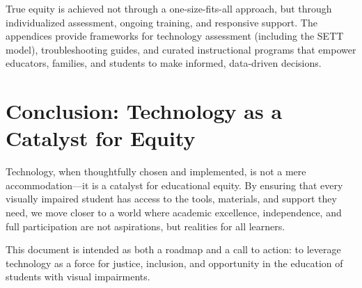 True equity is achieved not through a one-size-fits-all approach, but through individualized assessment, ongoing training, and responsive support.\supercite{Presley2012, WATIAssessing} The appendices provide frameworks for technology assessment (including the SETT model\supercite{Zabala2005, Hollingshead2020}), troubleshooting guides, and curated instructional programs that empower educators, families, and students to make informed, data-driven decisions.

\section{Conclusion: Technology as a Catalyst for Equity}
\label{sec:intro-conclusion}

Technology, when thoughtfully chosen and implemented, is not a mere accommodation—it is a catalyst for educational equity. By ensuring that every visually impaired student has access to the tools, materials, and support they need, we move closer to a world where academic excellence, independence, and full participation are not aspirations, but realities for all learners.

\bigskip

This document is intended as both a roadmap and a call to action: to leverage technology as a force for justice, inclusion, and opportunity in the education of students with visual impairments.\supercite{Warschauer2003TechnologyAndSocialInclusion}
